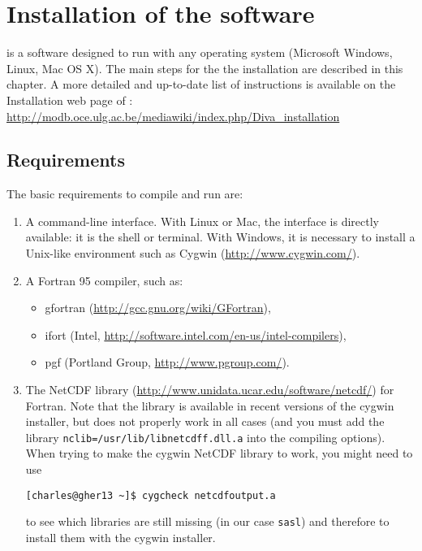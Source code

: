 \chapter{Installation of the software}

\diva is a software designed to run with any operating system (Microsoft Windows, Linux, Mac OS X). The main steps for the the installation are described in this chapter. A more detailed and up-to-date list of instructions is available on the Installation web page of \diva: \url{http://modb.oce.ulg.ac.be/mediawiki/index.php/Diva_installation}


\minitoc




\section{Requirements}

The basic requirements to compile and run \diva are:
\begin{enumerate}
\item A command-line interface. With Linux or Mac, the interface is directly available: it is the shell or terminal. With Windows, it is necessary to install a Unix-like environment such as Cygwin (\url{http://www.cygwin.com/}).
\item A Fortran 95 compiler, such as:
\begin{itemize}
\item gfortran (\url{http://gcc.gnu.org/wiki/GFortran}),
\item ifort (Intel\textsuperscript{\textregistered}, \url{http://software.intel.com/en-us/intel-compilers}),
\item pgf (Portland Group, \url{http://www.pgroup.com/}).
\end{itemize}    
\item The NetCDF library (\url{http://www.unidata.ucar.edu/software/netcdf/}) for Fortran. Note that the library is available in recent versions of the cygwin installer, but does not properly work in all cases (and you must add the library \texttt{nclib=/usr/lib/libnetcdff.dll.a} into the compiling options). When trying to make the cygwin NetCDF library to work, you might need to use 

\begin{lstlisting}[style=Bash]
[charles@gher13 ~]$ cygcheck netcdfoutput.a
\end{lstlisting}
to see which libraries are still missing (in our case \texttt{sasl}) and therefore to install them with the cygwin installer.  
\end{enumerate}


